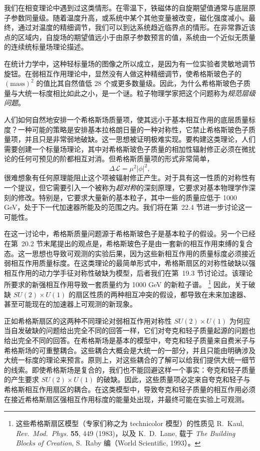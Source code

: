 我们在相变理论中遇到过这类情形。在零温下，铁磁体的自旋期望值通常与底层原子参数同量级。随着温度升高，或系统中某个其他变量被改变，磁化强度减小。最终，通过对温度的精细调节，我们可以到达系统趋近临界点的情形。在非常靠近该点的区域内，自旋场的期望值远小于由原子参数预言的值，系统由一个近似无质量的连续统标量场理论描述。

在统计力学中，这种轻标量场的图像之所以成立，是因为有一位实验者灵敏地调节旋钮。在弱相互作用理论中，显然没有人做这种精细调节，使希格斯玻色子的 $(\mathrm{mass})^2$ 的值比其自然值低 28 个或更多数量级。因此，为什么希格斯玻色子质量与大统一标度相比如此之小，是一个谜。粒子物理学家把这个问题称为\emph{规范层级问题}。

人们如何自然地安排一个希格斯场质量项，使其远小于基本相互作用的底层质量标度？一种可能的策略是安排基本拉格朗日量的一种对称性，它禁止希格斯玻色子质量项，并且只是非常弱地破缺。这一思想被证明极难实现。要构建这类理论，人们需要创建一个标量场理论，其中对希格斯玻色子质量的相加性辐射修正必须在微扰论的任何可预见的阶都相互对消。但希格斯质量项的形式非常简单，
\begin{equation}
  \Delta\mathcal{L} = \mu^2|\phi|^2 ,
  \label{eq:22.9}
\end{equation}
很难想象有任何原理能阻止这个项被辐射修正产生。对于具有这一性质的对称性有一个提议，但它需要引入一个被称为\emph{超对称}的深刻原理，它要求对基本物理学作深刻的修改。特别是，它要求大量新的基本粒子，其中一些的质量应低于 1000 GeV，处于下一代加速器所能及的范围之内。我们将在第~22.4 节进一步讨论这一可能性。

在这一讨论中，希格斯质量问题源于希格斯玻色子是基本粒子的假设。另一个已经在第~20.2 节末尾提出的观点是，希格斯玻色子是由一套新的相互作用束缚的复合态。这一思想也导致可观测的实验后果，因为这些新相互作用的质量标度必须接近弱相互作用质量标度。在这类理论的最简单形式中，希格斯扇区的对称性破缺以强相互作用的动力学手征对称性破缺为模型，后者我们在第~19.3 节讨论过。该理论所要求的新强相互作用导致一套质量约为 1000 GeV 的新粒子谱。%
\footnote{这些希格斯扇区模型（专家们称之为 technicolor 模型）的性质见 R.~Kaul, \emph{Rev.\ Mod.\ Phys.} \textbf{55}, 449 (1983)，以及 K.~D.~Lane, 载于 \emph{The Building Blocks of Creation}, S.~Raby 编（World Scientific, 1993）。} 因此，关于破缺 $SU(2)\times U(1)$ 的扇区性质的两种相互冲突的假设，都导致在未来加速器、甚至可能现在的加速器上可观测的新现象。

正如希格斯扇区的这两种不同理论对弱相互作用对称性 $SU(2)\times U(1)$ 为何应当自发破缺的问题给出完全不同的回答一样，它们对夸克和轻子质量起源的问题也给出完全不同的回答。在希格斯场是基本的模型中，夸克和轻子质量来自费米子与希格斯场的可重整耦合。这些耦合大概会是大统一的一部分，并且只能由明确涉及大统一标度的理论来预言。原则上，对这些耦合的了解可以给我们提供大统一细节的线索。即使希格斯场是复合的，我们也不能回避这样一个事实：夸克和轻子质量的产生要求 $SU(2)\times U(1)$ 的破缺。因此，这些质量项必定来自夸克和轻子与希格斯相互作用扇区的耦合。在这类模型中，导致夸克和轻子质量的相互作用必须在接近希格斯扇区强相互作用标度的能量处出现，并最终可能在实验上可观测。

